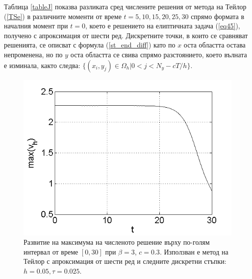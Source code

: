 \documentclass[a4paper]{article}
\newcommand{\rf}[1]{(\ref{#1})}
\theoremstyle{remark}
\begin{document}
\begin{large}
Таблица \ref{tableJ} показва разликата сред числените решения от метода на Тейлор \rf{TSe} в различните моменти от време $t=5,10,15,20,25,30$ спрямо формата в началния момент при $t=0$, което е решението на елиптичната задача \rf{eq45}, получено с апроксимация от шести ред. Дискретните точки, в които се сравняват решенията, се описват с формула \rf{st_end_diff} като по $x$ оста областта остава непроменена, но по $y$ оста областта се свива спрямо разстоянието, което вълната е изминала, както следва: $\{(x_i, y_j) \in \Omega_h |0 < j < N_y - cT/h\}$.

\begin{figure}
	\centering
	\includegraphics[width=0.7\linewidth]{SolutionView/maximum_50_bt3_c030_h005.png}
\caption{Развитие на максимума на численото решение върху по-голям интервал от време $[0, 30]$ при $\beta = 3$, $c=0.3$. Използван е метод на Тейлор с апроксимация от шести ред и следните дискретни стъпки: $h=0.05, \tau = 0.025$.}
\label{Maximum2}
\end{figure}
\FloatBarrier


\end{large}
\end{document}
